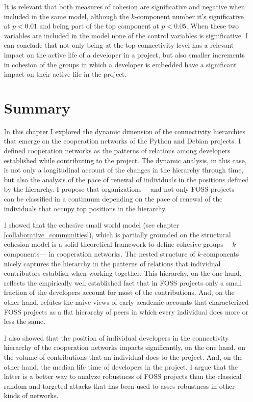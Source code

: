 It is relevant that both measures of cohesion are significative and negative when included in the same model, although the $k$-component number it's significative at $p < 0.01$ and being part of the top component at $p < 0.05$. When these two variables are included in the model none of the control variables is significative. I can conclude that not only being at the top connectivity level has a relevant impact on the active life of a developer in a project, but also smaller increments in cohesion of the groups in which a developer is embedded have a significant impact on their active life in the project.

\section{Summary}

In this chapter I explored the dynamic dimension of the connectivity hierarchies that emerge on the cooperation networks of the Python and Debian projects. I defined cooperation networks as the patterns of relations among developers established while contributing to the project. The dynamic analysis, in this case, is not only a longitudinal account of the changes in the hierarchy through time, but also the analysis of the pace of renewal of individuals in the positions defined by the hierarchy. I propose that organizations ---and not only FOSS projects--- can be classified in a continuum depending on the pace of renewal of the individuals that occupy top positions in the hierarchy.

I showed that the cohesive small world model (see chapter \ref{collaborative_communities}), which is partially grounded on the structural cohesion model \citep{white:2001, moody:2003} is a solid theoretical framework to define cohesive groups ---$k$-components--- in cooperation networks. The nested structure of $k$-components nicely captures the hierarchy in the patterns of relations that individual contributors establish when working together. This hierarchy, on the one hand, reflects the empirically well established fact that in FOSS projects only a small fraction of the developers account for most of the contributions. And, on the other hand, refutes the naive views of early academic accounts that characterized FOSS projects as a flat hierarchy of peers in which every individual does more or less the same.

I also showed that the position of individual developers in the connectivity hierarchy of the cooperation networks impacts significantly, on the one hand, on the volume of contributions that an individual does to the project. And, on the other hand, the median life time of developers in the project. I argue that the latter is a better way to analyze robustness of FOSS projects than the classical random and targeted attacks that has been used to asses robustness in other kinds of networks.

